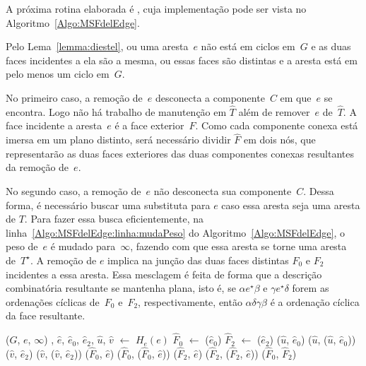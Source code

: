 A próxima rotina elaborada é \MSFdelEdge{}, cuja implementação pode ser vista no Algoritmo~\ref{Algo:MSFdelEdge}.

Pelo Lema~\ref{lemma:diestel}, ou uma aresta~$e$ não está em ciclos em~$G$ e as duas faces incidentes a ela são a mesma, ou essas faces são distintas e a aresta está em pelo menos um ciclo em~$G$.

No primeiro caso, a remoção de~$e$ desconecta a componente~$C$ em que~$e$ se encontra.
Logo não há trabalho de manutenção em $\hat T$ além de remover~$e$ de~$\hat T$.
A face incidente a aresta~$e$ é a face exterior~$F$.
Como cada componente conexa está imersa em um plano distinto, será necessário dividir $\hat F$ em dois nós, que representarão as duas faces exteriores das duas componentes conexas resultantes da remoção de~$e$.


No segundo caso, a remoção de~$e$ não desconecta sua componente~$C$.
Dessa forma, é necessário buscar uma substituta para $e$ caso essa aresta seja uma aresta de $T$.
Para fazer essa busca eficientemente, na linha~\ref{Algo:MSFdelEdge:linha:mudaPeso} do Algoritmo~\ref{Algo:MSFdelEdge}, o peso de~$e$ é mudado para~$\infty$, fazendo com que essa aresta se torne uma aresta de~$T^\star$. 
A remoção de $e$ implica na junção das duas faces distintas $F_0$ e $F_2$ incidentes a essa aresta.
Essa mesclagem é feita de forma que a descrição combinatória resultante se mantenha plana, isto é, se $\alpha e^\star \beta$ e $\gamma e^\star \delta$ forem as ordenações cíclicas de~$F_0$ e~$F_2$, respectivamente, então $\alpha \delta\gamma\beta$ é a ordenação cíclica da face resultante.

\begin{algorithm}[hbt]
\caption{\MSFdelEdge($G$, $e$)}
\label{Algo:MSFdelEdge}
\begin{algorithmic}[1]
\State \MSFupdate($G$, $e$, $\infty$)\label{Algo:MSFdelEdge:linha:mudaPeso}
\State {}, $\hat e$, $\hat e_0$, $\hat e_2$, $\hat u$, $\hat v$ $\gets$ $H_e(e)$
\State $\hat F_0$ $\gets$ \LCOLeftFace($\hat e_0$)
\State $\hat F_2$ $\gets$ \LCOLeftFace($\hat e_2$)
\State \LCOCycle($\hat u$, $\hat e_0$)
\State \LCOSplit($\hat u$, \LCOPredecessor($\hat u$, $\hat e_0$))
\State \LCOCycle($\hat v$, $\hat e_2$)
\State \LCOSplit($\hat v$, \LCOPredecessor($\hat v$, $\hat e_2$))
\State \LCOCycle($\hat F_0$, $\hat e$)
\State \LCOSplit($\hat F_0$, \LCOPredecessor($\hat F_0$, $\hat e$))
\State \LCOCycle($\hat F_2$, $\hat e$)
\State \LCOSplit($\hat F_2$, \LCOPredecessor($\hat F_2$, $\hat e$))
\State \LCOMerge($\hat F_0$, $\hat F_2$)
\end{algorithmic}
\end{algorithm}

